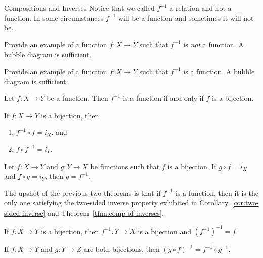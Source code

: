 \begin{section}{Compositions and Inverses}
Notice that we called $f^{-1}$ a relation and not a function.  In some circumstances $f^{-1}$ will be a function and sometimes it will not be.

\begin{exercise}
Provide an example of a function $f:X\to Y$ such that $f^{-1}$ is \emph{not} a function.  A bubble diagram is sufficient.
\end{exercise}

\begin{exercise}
Provide an example of a function $f:X\to Y$ such that $f^{-1}$ is a function. A bubble diagram is sufficient.
\end{exercise}

\begin{theorem}
Let $f:X\to Y$ be a function.  Then $f^{-1}$ is a function if and only if $f$ is a bijection.
\end{theorem}

\begin{theorem}\label{thm:comp of inverses}
If $f:X\to Y$ is a bijection, then
\begin{enumerate}[label=\textrm{(\alph*)}]
\item $f^{-1}\circ f=i_X$, and
\item $f\circ f^{-1}=i_Y$.
\end{enumerate}
\end{theorem}

\begin{theorem}\label{thm:unique inverse}
Let $f:X\to Y$ and $g:Y\to X$ be functions such that $f$ is a bijection.  If $g\circ f=i_X$ and $f\circ g=i_Y$, then $g=f^{-1}$.
\end{theorem}

The upshot of the previous two theorems is that if $f^{-1}$ is a function, then it is the only one satisfying the two-sided inverse property exhibited in Corollary~\ref{cor:two-sided inverse} and Theorem~\ref{thm:comp of inverses}. %

\begin{theorem}
If $f:X\to Y$ is a bijection, then $f^{-1}:Y\to X$ is a bijection and $(f^{-1})^{-1}=f$.
\end{theorem}

\begin{theorem}
If $f:X\to Y$ and $g:Y\to Z$ are both bijections, then $(g\circ f)^{-1}=f^{-1}\circ g^{-1}$.
\end{theorem}


\end{section}
